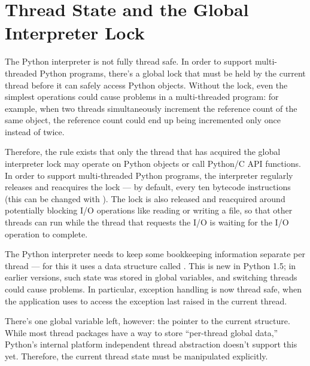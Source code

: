 
\section{Thread State and the Global Interpreter Lock
         \label{threads}}


The Python interpreter is not fully thread safe.  In order to support
multi-threaded Python programs, there's a global lock that must be
held by the current thread before it can safely access Python objects.
Without the lock, even the simplest operations could cause problems in
a multi-threaded program: for example, when two threads simultaneously
increment the reference count of the same object, the reference count
could end up being incremented only once instead of twice.

Therefore, the rule exists that only the thread that has acquired the
global interpreter lock may operate on Python objects or call Python/C
API functions.  In order to support multi-threaded Python programs,
the interpreter regularly releases and reacquires the lock --- by
default, every ten bytecode instructions (this can be changed with
).  The lock is also released and
reacquired around potentially blocking I/O operations like reading or
writing a file, so that other threads can run while the thread that
requests the I/O is waiting for the I/O operation to complete.

The Python interpreter needs to keep some bookkeeping information
separate per thread --- for this it uses a data structure called
.  This is new in Python
1.5; in earlier versions, such state was stored in global variables,
and switching threads could cause problems.  In particular, exception
handling is now thread safe, when the application uses
 to access the exception last raised in the
current thread.

There's one global variable left, however: the pointer to the current
 structure.  While most
thread packages have a way to store ``per-thread global data,''
Python's internal platform independent thread abstraction doesn't
support this yet.  Therefore, the current thread state must be
manipulated explicitly.

